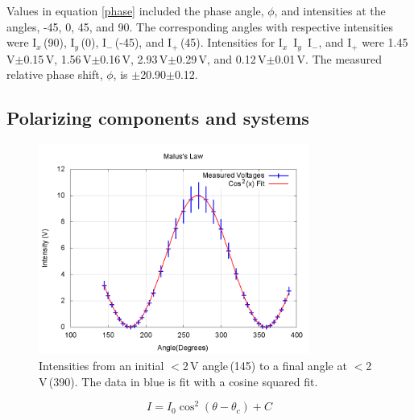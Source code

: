 \documentclass[aps,prl,twocolumn,superscriptaddress,nofootinbib]{revtex4-1}
\begin{document}
Values in equation \ref{phase} included the phase angle, $\phi$, and intensities at the angles, -45\degree, 0\degree, 45\degree, and 90\degree. The corresponding angles with respective intensities were I$_x$\,(90\degree), I$_y$\,(0\degree), I$_-$\,(-45\degree), and I$_+$\,(45\degree). Intensities for I$_x$\, I$_y$\, I$_-$, and I$_+$ were 1.45\,V$\pm$0.15\,V, 1.56\,V$\pm$0.16\,V, 2.93\,V$\pm$0.29\,V, and 0.12\,V$\pm$0.01\,V. The measured relative phase shift, $\phi$, is $\pm$20.90\degree$\pm$0.12\degree.

\subsection{Polarizing components and systems}

\begin{figure}[h!]
  \begin{center}
\centerline{\includegraphics[width=3.5in]{malus.png}}
\caption{\small{Intensities from an initial $<$2\,V angle\,(145\degree) to a final angle at $<$2\,V\,(390\degree). The data in blue is fit with a cosine squared fit. \label{malus}}}
  \end{center}
\end{figure}
\vspace{-.7cm}

\begin{equation}
I=I_0\cos^{2}(\theta-\theta_c)+C
\label{maleqn}
\end{equation}
\end{document}
